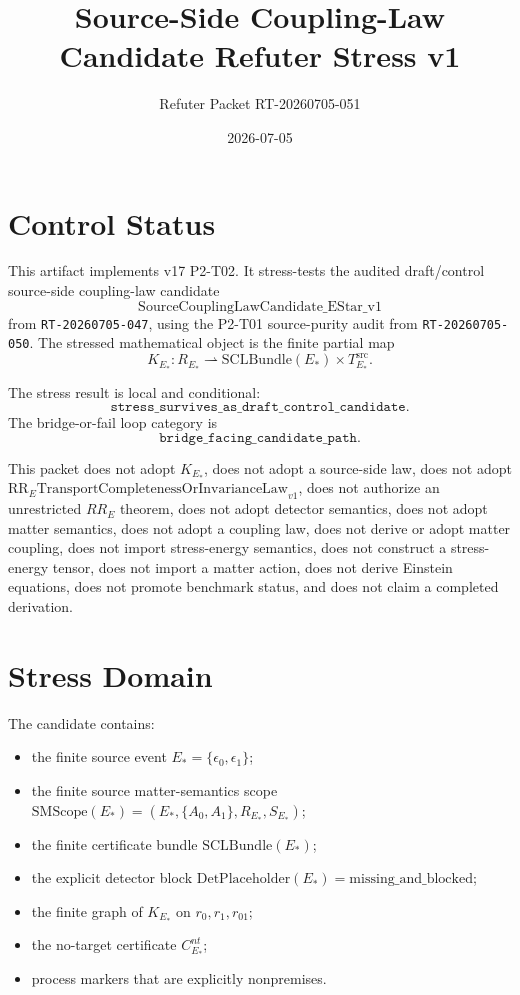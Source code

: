 \documentclass[11pt]{article}
\title{Source-Side Coupling-Law Candidate Refuter Stress v1}
\author{Refuter Packet RT-20260705-051}
\date{2026-07-05}
\newcommand{\EStar}{E_{\ast}}
\newcommand{\SMScope}{\mathrm{SMScope}}
\newcommand{\SCLBundle}{\mathrm{SCLBundle}}
\newcommand{\DetPlaceholder}{\mathrm{DetPlaceholder}}
\newcommand{\KStar}{K_{E_{\ast}}}
\newcommand{\Src}{\mathrm{src}}
\begin{document}
\maketitle

\section{Control Status}

This artifact implements v17 P2-T02. It stress-tests the audited
draft/control source-side coupling-law candidate
\[
  \mathrm{SourceCouplingLawCandidate\_EStar\_v1}
\]
from \texttt{RT-20260705-047}, using the P2-T01 source-purity audit from
\texttt{RT-20260705-050}. The stressed mathematical object is the finite
partial map
\[
  \KStar:R_{\EStar}\rightharpoonup
  \SCLBundle(\EStar)\times T_{\EStar}^{\Src}.
\]

The stress result is local and conditional:
\[
  \texttt{stress\_survives\_as\_draft\_control\_candidate}.
\]
The bridge-or-fail loop category is
\[
  \texttt{bridge\_facing\_candidate\_path}.
\]

This packet does not adopt \(\KStar\), does not adopt a source-side law, does
not adopt \(\mathrm{RR}_{E}\mathrm{TransportCompletenessOrInvarianceLaw}_{v1}\),
does not authorize an unrestricted \(RR_E\) theorem, does not adopt detector
semantics, does not adopt matter semantics, does not adopt a coupling law, does
not derive or adopt matter coupling, does not import stress-energy semantics,
does not construct a stress-energy tensor, does not import a matter action,
does not derive Einstein equations, does not promote benchmark status, and
does not claim a completed derivation.

\section{Stress Domain}

The candidate contains:

\begin{itemize}[leftmargin=2em]
  \item the finite source event \(\EStar=\{\epsilon_0,\epsilon_1\}\);
  \item the finite source matter-semantics scope
        \(\SMScope(\EStar)=(\EStar,\{A_0,A_1\},R_{\EStar},S_{\EStar})\);
  \item the finite certificate bundle
        \(\SCLBundle(\EStar)\);
  \item the explicit detector block
        \(\DetPlaceholder(\EStar)=\mathrm{missing\_and\_blocked}\);
  \item the finite graph of \(\KStar\) on \(r_0,r_1,r_{01}\);
  \item the no-target certificate \(C^{nt}_{\EStar}\);
  \item process markers that are explicitly nonpremises.
\end{itemize}
\end{document}
